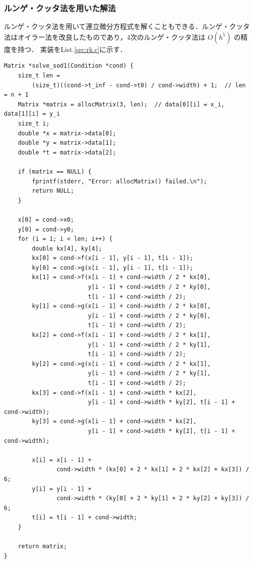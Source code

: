 \documentclass[gutter=20mm,fore-edge=20mm,head_space=30mm,foot_space=30mm]{jlreq}
\begin{document}
\subsubsection{ルンゲ・クッタ法を用いた解法}
ルンゲ・クッタ法を用いて連立微分方程式を解くこともできる．ルンゲ・クッタ法はオイラー法を改良したものであり，4次のルンゲ・クッタ法は $O(h^5)$ の精度を持つ．
実装をList.\ref{src:rk.c}に示す．
\begin{lstlisting}[caption=rk.c,label=src:rk.c]
Matrix *solve_sod1(Condition *cond) {
    size_t len =
        (size_t)((cond->t_inf - cond->t0) / cond->width) + 1;  // len = n + 1
    Matrix *matrix = allocMatrix(3, len);  // data[0][i] = x_i, data[1][i] = y_i
    size_t i;
    double *x = matrix->data[0];
    double *y = matrix->data[1];
    double *t = matrix->data[2];

    if (matrix == NULL) {
        fprintf(stderr, "Error: allocMatrix() failed.\n");
        return NULL;
    }

    x[0] = cond->x0;
    y[0] = cond->y0;
    for (i = 1; i < len; i++) {
        double kx[4], ky[4];
        kx[0] = cond->f(x[i - 1], y[i - 1], t[i - 1]);
        ky[0] = cond->g(x[i - 1], y[i - 1], t[i - 1]);
        kx[1] = cond->f(x[i - 1] + cond->width / 2 * kx[0],
                        y[i - 1] + cond->width / 2 * ky[0],
                        t[i - 1] + cond->width / 2);
        ky[1] = cond->g(x[i - 1] + cond->width / 2 * kx[0],
                        y[i - 1] + cond->width / 2 * ky[0],
                        t[i - 1] + cond->width / 2);
        kx[2] = cond->f(x[i - 1] + cond->width / 2 * kx[1],
                        y[i - 1] + cond->width / 2 * ky[1],
                        t[i - 1] + cond->width / 2);
        ky[2] = cond->g(x[i - 1] + cond->width / 2 * kx[1],
                        y[i - 1] + cond->width / 2 * ky[1],
                        t[i - 1] + cond->width / 2);
        kx[3] = cond->f(x[i - 1] + cond->width * kx[2],
                        y[i - 1] + cond->width * ky[2], t[i - 1] + cond->width);
        ky[3] = cond->g(x[i - 1] + cond->width * kx[2],
                        y[i - 1] + cond->width * ky[2], t[i - 1] + cond->width);

        x[i] = x[i - 1] +
               cond->width * (kx[0] + 2 * kx[1] + 2 * kx[2] + kx[3]) / 6;
        y[i] = y[i - 1] +
               cond->width * (ky[0] + 2 * ky[1] + 2 * ky[2] + ky[3]) / 6;
        t[i] = t[i - 1] + cond->width;
    }

    return matrix;
}
\end{lstlisting}
\end{document}
